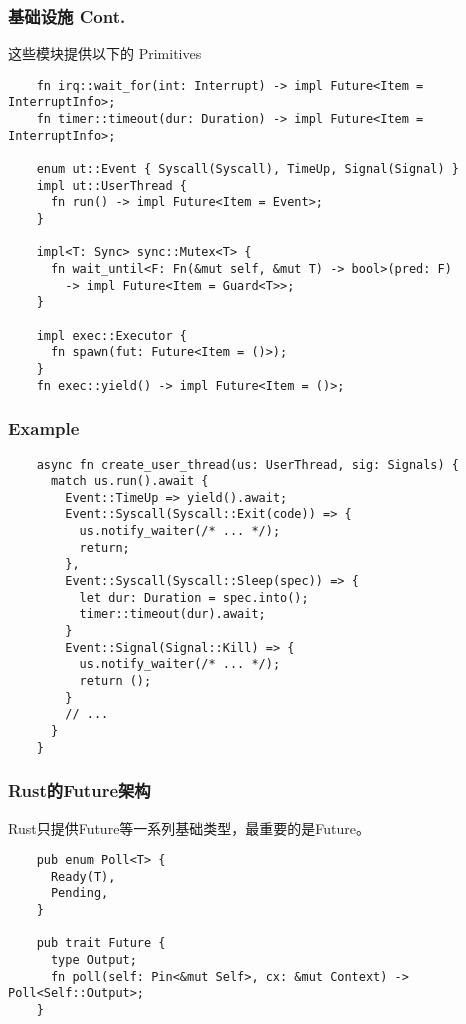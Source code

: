 \documentclass[UTF-8]{ctexbeamer}
\begin{document}
\begin{frame}[fragile]
  \frametitle{基础设施 Cont.}

  这些模块提供以下的 Primitives
  \vspace{1em}

  {
    \scriptsize
    \begin{verbatim}
    fn irq::wait_for(int: Interrupt) -> impl Future<Item = InterruptInfo>;
    fn timer::timeout(dur: Duration) -> impl Future<Item = InterruptInfo>;

    enum ut::Event { Syscall(Syscall), TimeUp, Signal(Signal) }
    impl ut::UserThread {
      fn run() -> impl Future<Item = Event>;
    }

    impl<T: Sync> sync::Mutex<T> {
      fn wait_until<F: Fn(&mut self, &mut T) -> bool>(pred: F)
        -> impl Future<Item = Guard<T>>;
    }

    impl exec::Executor {
      fn spawn(fut: Future<Item = ()>);
    }
    fn exec::yield() -> impl Future<Item = ()>;
  \end{verbatim}
  }
\end{frame}

\begin{frame}[fragile]
  \frametitle{Example}

  \scriptsize
  \begin{verbatim}
    async fn create_user_thread(us: UserThread, sig: Signals) {
      match us.run().await {
        Event::TimeUp => yield().await;
        Event::Syscall(Syscall::Exit(code)) => {
          us.notify_waiter(/* ... */);
          return;
        },
        Event::Syscall(Syscall::Sleep(spec)) => {
          let dur: Duration = spec.into();
          timer::timeout(dur).await;
        }
        Event::Signal(Signal::Kill) => {
          us.notify_waiter(/* ... */);
          return ();
        }
        // ...
      }
    }
  \end{verbatim}
\end{frame}

\begin{frame}[fragile]
  \frametitle{Rust的Future架构}

  Rust只提供Future等一系列基础类型，最重要的是Future。
  {
  \scriptsize
  \begin{verbatim}
    pub enum Poll<T> {
      Ready(T),
      Pending,
    }

    pub trait Future {
      type Output;
      fn poll(self: Pin<&mut Self>, cx: &mut Context) -> Poll<Self::Output>;
    }
  \end{verbatim}
  }
\end{frame}
\end{document}

